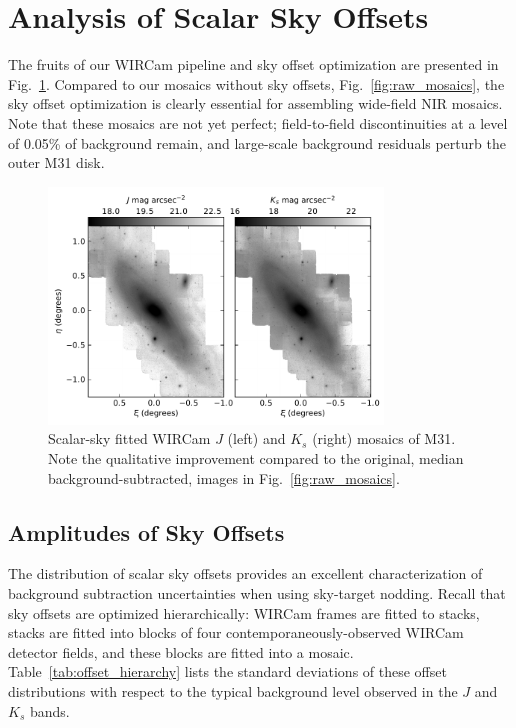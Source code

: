 \documentclass[iop]{emulateapj}
\newcommand{\Fig}[1]{Fig.~\ref{fig:#1}}  %
\newcommand{\Tab}[1]{Table~\ref{tab:#1}}  %
\begin{document}
\section{Analysis of Scalar Sky Offsets}
\label{sec:scalaranalysis}

The fruits of our WIRCam pipeline and sky offset optimization are presented in \Fig{scalar_mosaics}.
Compared to our mosaics without sky offsets, \Fig{raw_mosaics}, the sky offset optimization is clearly essential for assembling wide-field NIR mosaics.
Note that these mosaics are not yet perfect; field-to-field discontinuities at a level of 0.05\% of background remain, and large-scale background residuals perturb the outer M31 disk.

\begin{figure}[t]
	\centering
		\includegraphics[width=3.5in]{figs/scalar_mosaics}
	\caption{Scalar-sky fitted WIRCam $J$ (left) and $K_s$ (right) mosaics of M31. Note the qualitative improvement compared to the original, median background-subtracted, images in \Fig{raw_mosaics}.}
	\label{fig:scalar_mosaics}
\end{figure}

\subsection{Amplitudes of Sky Offsets}
\label{sec:offset_amplitudes}

The distribution of scalar sky offsets provides an excellent characterization of background subtraction uncertainties when using sky-target nodding.
Recall that sky offsets are optimized hierarchically: WIRCam frames are fitted to stacks, stacks are fitted into blocks of four contemporaneously-observed WIRCam detector fields, and these blocks are fitted into a mosaic.
\Tab{offset_hierarchy} lists the standard deviations of these offset distributions with respect to the typical background level observed in the $J$ and $K_s$ bands.
\end{document}
